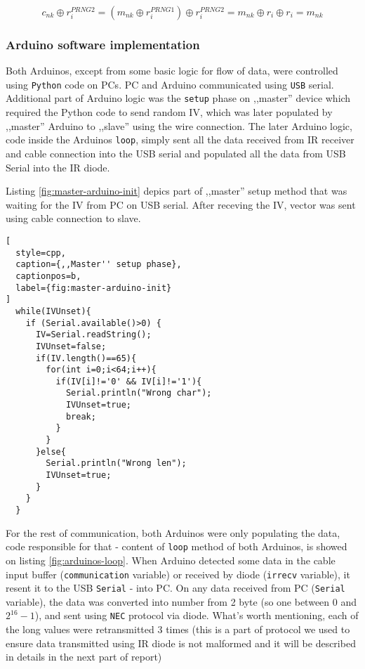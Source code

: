 \begin{equation} \label{eq:7} c_{nk} \oplus r_{i}^{PRNG2} = (m_{nk} \oplus r_{i}^{PRNG1}) \oplus r_{i}^{PRNG2} = m_{nk} \oplus r_{i} \oplus r_{i} = m_{nk}\end{equation}

\subsubsection{Arduino software implementation}
Both Arduinos, except from some basic logic for flow of data, were controlled using \texttt{Python} code on PCs. PC and Arduino communicated using \texttt{USB} serial. Additional part of Arduino logic was the \texttt{setup} phase on
,,master'' device which required the Python code to send random IV, which was later populated by ,,master'' Arduino to ,,slave'' using the wire connection. The later Arduino logic, code inside the Arduinos \texttt{loop}, simply sent all the data received from IR receiver and cable connection into the USB serial and populated all the data from USB Serial into the IR diode.

Listing \ref{fig:master-arduino-init} depics part of ,,master'' setup method that was waiting for the IV from PC on USB serial. After receving the IV, vector was sent using cable connection to slave.

\begin{minipage}{\linewidth}
\begin{lstlisting}[
  style=cpp,
  caption={,,Master'' setup phase},
  captionpos=b,
  label={fig:master-arduino-init}
]
  while(IVUnset){
    if (Serial.available()>0) {
      IV=Serial.readString();
      IVUnset=false;
      if(IV.length()==65){
        for(int i=0;i<64;i++){
          if(IV[i]!='0' && IV[i]!='1'){
            Serial.println("Wrong char");
            IVUnset=true;
            break;
          }
        }
      }else{
        Serial.println("Wrong len");
        IVUnset=true;
      }
    }
  }
\end{lstlisting}
\end{minipage}

For the rest of communication, both Arduinos were only populating the data, code responsible for that - content of \texttt{loop} method of both Arduinos, is showed on listing \ref{fig:arduinos-loop}. When Arduino detected some data in the cable input buffer (\texttt{communication} variable) or received by diode (\texttt{irrecv} variable), it resent it to the USB \texttt{Serial} - into PC. On any data received from PC (\texttt{Serial} variable), the data was converted into number from 2 byte (so one between $0$ and $2^{16} - 1$), and sent using \texttt{NEC} protocol via diode. What's worth mentioning, each of the long values were retransmitted 3 times (this is a part of protocol we used to ensure data transmitted using IR diode is not malformed and it will be described in details in the next part of report)

